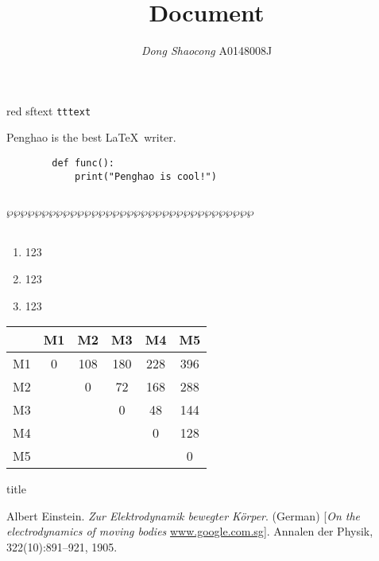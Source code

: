 \documentclass[12pt,a4paper]{article}
\title{\textbf{Document}}
\author{\textit{Dong Shaocong} A0148008J}
\theoremstyle{definition}
\begin{document}
\maketitle



\newpage

{\color{red} red } \textsf{sftext} \texttt{tttext}
\begin{tcolorbox} 
Penghao is the best \LaTeX \, writer.
\end{tcolorbox}
\begin{tcolorbox}
	\begin{lstlisting}
		def func():
			print("Penghao is cool!")
	\end{lstlisting}
\end{tcolorbox}
\noindent{}\\\noindent$\wp\wp\wp\wp\wp\wp\wp\wp\wp\wp\wp\wp\wp\wp\wp\wp\wp\wp\wp\wp\wp\wp\wp\wp\wp\wp\wp\wp\wp\wp\wp\wp\wp\wp\wp$\\
{}\\
\lipsum[1]

\vspace{-\topsep}
\begin{enumerate}
	\item 123
	\item 123
	\item 123
\end{enumerate}
\vspace{-\topsep}

\begin{center}
 \begin{tabular}{|| c || c | c | c |c |c ||} 
 \hline
  & M1 & M2 & M3 & M4 & M5 \\ [0.5ex] 
 \hline\hline
 M1 & 0 & 108 & 180 & 228 & 396 \\ 
 \hline
 M2 &  & 0 & 72 & 168 & 288 \\
 \hline
 M3 &  &  & 0 & 48 & 144 \\
 \hline
 M4 &  &  &  & 0 & 128 \\
 \hline
 M5 &  &  & &  & 0   \\ [0.5ex] 
 \hline
\end{tabular}
\end{center}

\begin{algorithm}
\caption{title}
\begin{algorithmic}[1]
\end{algorithmic}
\end{algorithm}

\begin{thebibliography}{9}
 
Albert Einstein. 
\textit{Zur Elektrodynamik bewegter K{\"o}rper}. (German) 
[\textit{On the electrodynamics of moving bodies} \url{www.google.com.sg}]. 
Annalen der Physik, 322(10):891–921, 1905.
\end{thebibliography}
\end{document}

